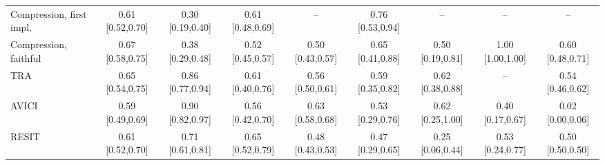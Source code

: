 \begin{table}[ht]
\begin{tabular}{@{}lcccccccc@{}}
Compression, first impl. & 0.61 [0.52,0.70] & 0.30 [0.19,0.40] & 0.61 [0.48,0.69] & -- & 0.76 [0.53,0.94] & -- & -- & --\\
Compression, faithful & 0.67 [0.58,0.75] & 0.38 [0.29,0.48] & 0.52 [0.45,0.57] & 0.50 [0.43,0.57] & 0.65 [0.41,0.88] & 0.50 [0.19,0.81] & 1.00 [1.00,1.00] & 0.60 [0.48,0.71]\\
TRA & 0.65 [0.54,0.75] & 0.86 [0.77,0.94] & 0.61 [0.40,0.76] & 0.56 [0.50,0.61] & 0.59 [0.35,0.82] & 0.62 [0.38,0.88] & -- & 0.54 [0.46,0.62]\\
AVICI & 0.59 [0.49,0.69] & 0.90 [0.82,0.97] & 0.56 [0.42,0.70] & 0.63 [0.58,0.68] & 0.53 [0.29,0.76] & 0.62 [0.25,1.00] & 0.40 [0.17,0.67] & 0.02 [0.00,0.06]\\
RESIT & 0.61 [0.52,0.70] & 0.71 [0.61,0.81] & 0.65 [0.52,0.79] & 0.48 [0.43,0.53] & 0.47 [0.29,0.65] & 0.25 [0.06,0.44] & 0.53 [0.24,0.77] & 0.50 [0.50,0.50]\\
\bottomrule
\end{tabular}
\end{table}


